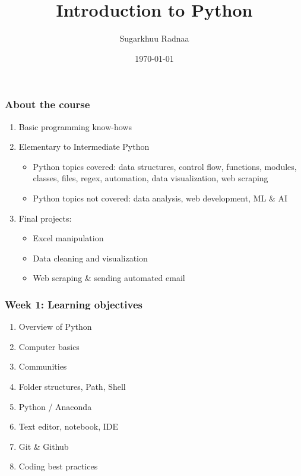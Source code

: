 \documentclass{beamer}
\title[Python Intro]{Introduction to Python} %
\author{Sugarkhuu Radnaa} %
\institute[] %
{
Py4Econ in Ulaanbaatar \\ %
\medskip
\textit{py4econ@gmail.com} %
}
\date{\today} %
\begin{document}
\begin{frame}
\titlepage %
\end{frame}

\begin{frame}
\frametitle{About the course} %
\begin{enumerate}
    \item Basic programming know-hows
    \item Elementary to Intermediate Python
        \begin{itemize}
            \item Python topics covered: data structures, control flow, functions, modules, classes, files, regex, automation, data visualization, web scraping
            \item Python topics not covered: data analysis, web development, ML & AI
        \end{itemize}
    \item Final projects:
        \begin{itemize}
            \item Excel manipulation 
            \item Data cleaning and visualization 
            \item Web scraping & sending automated email
        \end{itemize}
\end{enumerate}
\end{frame}


\begin{frame}
    \frametitle{Week 1: Learning objectives}
    \begin{enumerate}
        \item Overview of Python 
        \item Computer basics
        \item Communities
        \item Folder structures, Path, Shell
        \item Python / Anaconda
        \item Text editor, notebook, IDE
        \item Git & Github
        \item Coding best practices
    \end{enumerate}
\end{frame}
\end{document}
